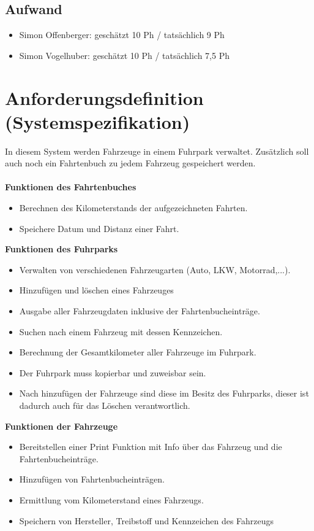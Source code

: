 \documentclass[12pt,naustrian,a4widepaper]{scrartcl}
\begin{document}
\subsection{Aufwand}
	
	\begin{itemize}
		\item Simon Offenberger: geschätzt 10 Ph / tatsächlich 9 Ph
		\item Simon Vogelhuber:  geschätzt 10 Ph / tatsächlich 7,5 Ph
	\end{itemize}

\clearpage
\section{Anforderungsdefinition (Systemspezifikation)}
In diesem System werden Fahrzeuge in einem Fuhrpark verwaltet. 
Zusätzlich soll auch noch ein Fahrtenbuch zu jedem Fahrzeug gespeichert werden.
\\
\\
\textbf{Funktionen des Fahrtenbuches}
\begin{itemize}
	\item Berechnen des Kilometerstands der aufgezeichneten Fahrten.
	\item Speichere Datum und Distanz einer Fahrt.
\end{itemize}

\textbf{Funktionen des Fuhrparks}
\begin{itemize}
	\item Verwalten von verschiedenen Fahrzeugarten (Auto, LKW, Motorrad,...).
	\item Hinzufügen und löschen eines Fahrzeuges
	\item Ausgabe aller Fahrzeugdaten inklusive der Fahrtenbucheinträge.
	\item Suchen nach einem Fahrzeug mit dessen Kennzeichen.
	\item Berechnung der Gesamtkilometer aller Fahrzeuge im Fuhrpark.
	\item Der Fuhrpark muss kopierbar und zuweisbar sein.
	\item Nach hinzufügen der Fahrzeuge sind diese im Besitz des Fuhrparks, dieser ist dadurch auch für das Löschen verantwortlich.
\end{itemize}

\textbf{Funktionen der Fahrzeuge}
\begin{itemize}
	\item Bereitstellen einer Print Funktion mit Info über das Fahrzeug und die Fahrtenbucheinträge.
	\item Hinzufügen von Fahrtenbucheinträgen.
	\item Ermittlung vom Kilometerstand eines Fahrzeugs.
	\item Speichern von Hersteller, Treibstoff und Kennzeichen des Fahrzeugs
\end{itemize}
\end{document}
